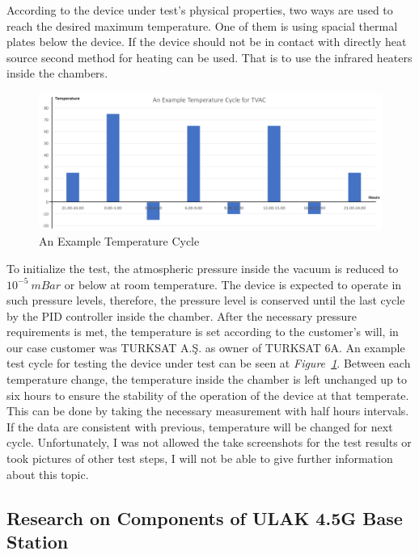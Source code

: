 	According to the device under test's physical properties, two ways are used to reach the desired maximum temperature. One of them is using spacial thermal plates below the device. If the device should not be in contact with directly heat source second method for heating can be used.  That is to use the infrared heaters inside the chambers.
	
\begin{figure}[H]
	\center
	\setlength{\unitlength}{\textwidth} 
	\includegraphics[width=1.0\unitlength]{tvac-cycle}
	\caption{\label{fig:tvac-cycle}An Example Temperature Cycle }
\end{figure}


	 To initialize the test, the atmospheric pressure inside the vacuum is reduced to $10^{-5}~mBar$ or below at room temperature. The device is expected to operate in such pressure levels, therefore, the pressure level is conserved until the last cycle by the PID controller inside the chamber. After the necessary pressure requirements is met, the temperature is set according to the customer's will, in our case customer was TURKSAT A.Ş. as owner of TURKSAT 6A. An example test cycle for testing the device under test can be seen at \textit{Figure~\ref{fig:tvac-cycle}}. Between each temperature change, the temperature inside the chamber is left unchanged up to six hours to ensure the stability of the operation of the device at that temperate. This can be done by taking the necessary measurement with half hours intervals. If the data are consistent with previous, temperature will be changed for next cycle. Unfortunately, I was not allowed the take screenshots for the test results or took pictures of other test steps,  I will not be able to give further information about this topic.
		

\subsection{Research on Components of ULAK 4.5G Base Station  }
\- \indent

